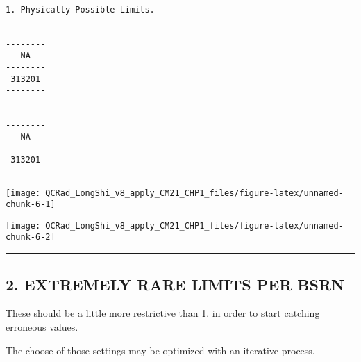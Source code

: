 \documentclass[
  10pt,
  a4paper,oneside]{article}
\newenvironment{Shaded}{\begin{snugshade}}{\end{snugshade}}
\newcommand{\AttributeTok}[1]{\textcolor[rgb]{0.77,0.63,0.00}{#1}}
\newcommand{\ConstantTok}[1]{\textcolor[rgb]{0.00,0.00,0.00}{#1}}
\newcommand{\FunctionTok}[1]{\textcolor[rgb]{0.00,0.00,0.00}{#1}}
\newcommand{\NormalTok}[1]{#1}
\newcommand{\SpecialCharTok}[1]{\textcolor[rgb]{0.00,0.00,0.00}{#1}}
\begin{document}
\begin{Shaded}
\end{Shaded}

\begin{verbatim}

1. Physically Possible Limits.


--------
   NA   
--------
 313201 
--------


--------
   NA   
--------
 313201 
--------
\end{verbatim}

\begin{center}\texttt{[image: QCRad\_LongShi\_v8\_apply\_CM21\_CHP1\_files/figure-latex/unnamed-chunk-6-1]} \end{center}

\begin{center}\texttt{[image: QCRad\_LongShi\_v8\_apply\_CM21\_CHP1\_files/figure-latex/unnamed-chunk-6-2]} \end{center}

\begin{center}\rule{0.5\linewidth}{0.5pt}\end{center}

\newpage

\hypertarget{extremely-rare-limits-per-bsrn}{%
\subsection{2. EXTREMELY RARE LIMITS PER BSRN}\label{extremely-rare-limits-per-bsrn}}

These should be a little more restrictive than 1. in order to start
catching erroneous values.

The choose of those settings may be optimized with an iterative process.
\end{document}
